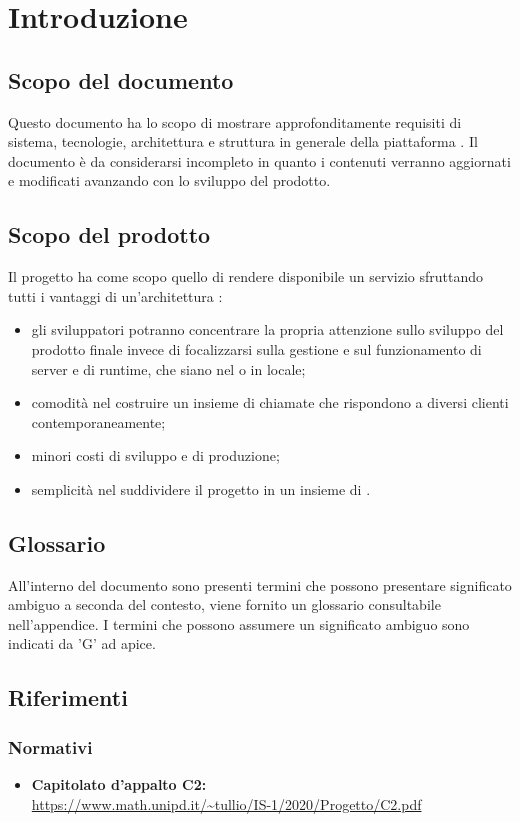 \section{Introduzione}
\label{introduzione}
\subsection{Scopo del documento}
Questo documento ha lo scopo di mostrare approfonditamente requisiti di sistema, tecnologie, architettura e struttura in generale della piattaforma \NomeProgetto. Il documento è da considerarsi incompleto in quanto i contenuti verranno aggiornati e modificati avanzando con lo sviluppo del prodotto.
\subsection{Scopo del prodotto} 
Il progetto {\NomeProgetto} ha come scopo quello di rendere disponibile un servizio  sfruttando tutti i vantaggi di un'architettura :
\begin{itemize}
	\item gli sviluppatori potranno concentrare la propria attenzione sullo sviluppo del prodotto finale invece di focalizzarsi sulla gestione e sul funzionamento di server e di runtime, che siano nel  o in locale;
	\item comodità nel costruire un insieme di chiamate  che rispondono a diversi clienti contemporaneamente;
	\item minori costi di sviluppo e di produzione;
	\item semplicità nel suddividere il progetto in un insieme di .
\end{itemize}
\subsection{Glossario}
All'interno del documento sono presenti termini che possono presentare significato ambiguo a seconda del contesto, viene fornito un glossario consultabile nell'appendice. I termini che possono assumere un significato ambiguo sono indicati da 'G' ad apice. 

\subsection{Riferimenti}
\subsubsection{Normativi}
\begin{itemize}
	\item \textbf{Capitolato d'appalto C2:}\\
	\url{https://www.math.unipd.it/~tullio/IS-1/2020/Progetto/C2.pdf}
\end{itemize}
